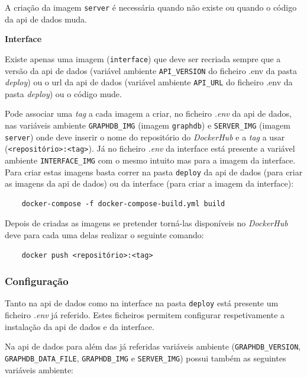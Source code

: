 \begin{description}
    A criação da imagem \texttt{server} é necessária quando não existe ou quando o código da \acrshort{api} de dados muda.

    \item \textbf{Interface}

    Existe apenas uma imagem (\texttt{interface}) que deve ser recriada sempre que a versão da \acrshort{api} de dados (variável ambiente \texttt{API\_VERSION} do ficheiro .env da pasta \textit{deploy}) ou o \acrshort{url} da \acrshort{api} de dados (variável ambiente \texttt{API\_URL} do ficheiro .env da pasta \textit{deploy}) ou o código mude.
\end{description}

Pode associar uma \textit{tag} a cada imagem a criar, no ficheiro \textit{.env} da \acrshort{api} de dados, nas variáveis ambiente \texttt{GRAPHDB\_IMG} (imagem \texttt{graphdb}) e \texttt{SERVER\_IMG} (imagem \texttt{server}) onde deve inserir o nome do repositório do \textit{DockerHub} e a \textit{tag} a usar (\verb|<repositório>:<tag>|). Já no ficheiro \textit{.env} da interface está presente a variável ambiente \texttt{INTERFACE\_IMG} com o mesmo intuito mas para a imagem da interface. Para criar estas imagens basta correr na pasta \texttt{deploy} da \acrshort{api} de dados (para criar as imagens da \acrshort{api} de dados) ou da interface (para criar a imagem da interface):

\footnotesize
\begin{verbatim}
    docker-compose -f docker-compose-build.yml build
\end{verbatim}
\normalsize

Depois de criadas as imagens se pretender torná-las disponíveis no \textit{DockerHub} deve para cada uma delas realizar o seguinte comando:
\footnotesize
\begin{verbatim}
    docker push <repositório>:<tag>
\end{verbatim}
\normalsize

\subsubsection{Configuração}\label{sec:int-config}
Tanto na \acrshort{api} de dados como na interface na pasta \texttt{deploy} está presente um ficheiro \textit{.env} já referido. Estes ficheiros permitem configurar respetivamente a instalação da \acrshort{api} de dados e da interface.

Na \acrshort{api} de dados para além das já referidas variáveis ambiente (\texttt{GRAPHDB\_VERSION}, \texttt{GRAPHDB\_DATA\_FILE}, \texttt{GRAPHDB\_IMG} e \texttt{SERVER\_IMG}) possui também as seguintes variáveis ambiente:

